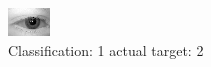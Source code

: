 \begin{figure}[h!]
\begin{center}
\includegraphics[width=0.60\columnwidth]{figures/ID410_class_1_target_2.png}
\end{center}
\caption{ Classification: 1 actual target: 2}
\label{fig:ID410_class_1_target_2}
\end{figure}
